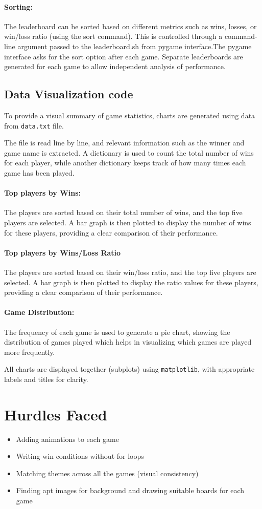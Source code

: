 \documentclass[12pt,a4paper]{article}
\begin{document}
\paragraph{Sorting:}
The leaderboard can be sorted based on different metrics such as wins, losses, or win/loss ratio (using the sort command). This is controlled through a command-line argument passed to the leaderboard.sh from pygame interface.The pygame interface asks for the sort option after each game. Separate leaderboards are generated for each game to allow independent analysis of performance.

\subsection{Data Visualization code}
To provide a visual summary of game statistics, charts are generated using data from \texttt{data.txt} file.

The file is read line by line, and relevant information such as the winner and game name is extracted. A dictionary is used to count the total number of wins for each player, while another dictionary keeps track of how many times each game has been played.
\paragraph{Top players by Wins:}
The players are sorted based on their total number of wins, and the top five players are selected. A bar graph is then plotted to display the number of wins for these players, providing a clear comparison of their performance.
\paragraph{Top players by Wins/Loss Ratio}
The players are sorted based on their win/loss ratio, and the top five players are selected. A bar graph is then plotted to display the ratio values for these players, providing a clear comparison of their performance.
\paragraph{Game Distribution:}
The frequency of each game is used to generate a pie chart, showing the distribution of games played which helps in visualizing which games are played more frequently.

All charts are displayed together (subplots) using \texttt{matplotlib}, with appropriate labels and titles for clarity.
\section{Hurdles Faced}
\begin{itemize}
    \item Adding animations to each game 
    \item Writing win conditions without for loops
    \item Matching themes across all the games (visual consistency)
    \item Finding apt images for background and drawing suitable boards for each game
\end{itemize}
\end{document}
